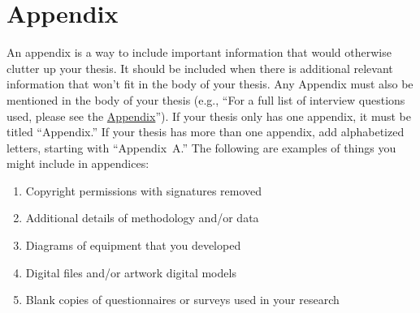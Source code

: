 

\chapter*{Appendix}\label{appendix}



An appendix is a way to include important information that would
otherwise clutter up your thesis. It should be included when there is
additional relevant information that won't fit in the body of your
thesis. Any Appendix must also be mentioned in the body of your thesis
(e.g., ``For a full list of interview questions used, please see the
\hyperref[appendix]{Appendix}''). If your thesis only has one appendix, it
must be titled ``Appendix.'' If your thesis has more than one appendix,
add alphabetized letters, starting with ``Appendix~A.'' The following
are examples of things you might include in appendices:
\begin{enumerate}
  \item Copyright permissions with signatures removed
  \item Additional details of methodology and/or data
  \item Diagrams of equipment that you developed
  \item Digital files and/or artwork digital models
  \item Blank copies of questionnaires or surveys used in your research
\end{enumerate}
